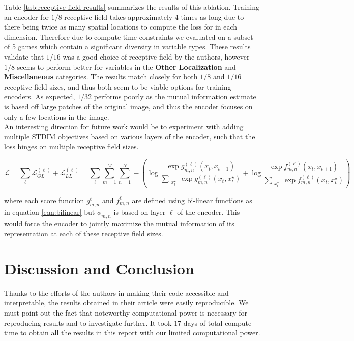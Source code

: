 Table \ref{tab:receptive-field-results} summarizes the results of this ablation. Training an encoder for $1/8$ receptive field takes approximately 4 times as long due to there being twice as many spatial locations to compute the loss for in each dimension. Therefore due to compute time constraints we evaluated on a subset of 5 games which contain a significant diversity in variable types. These results validate that $1/16$ was a good choice of receptive field by the authors, however $1/8$ seems to perform better for variables in the \textbf{Other Localization} and \textbf{Miscellaneous} categories. The results match closely for both $1/8$ and $1/16$ receptive field sizes, and thus both seem to be viable options for training encoders. As expected, $1/ 32$ performs poorly as the mutual information estimate is based off large patches of the original image, and thus the encoder focuses on only a few locations in the image. \\

An interesting direction for future work would be to experiment with adding multiple STDIM objectives based on various layers of the encoder, such that the loss hinges on multiple receptive field sizes.

\begin{equation}
\mathcal{L}=\sum_{\ell}\mathcal{L}^{(\ell)}_{GL}+\mathcal{L}^{(\ell)}_{LL}=\sum_{\ell}\sum_{m=1}^M\sum_{n=1}^N-\left(\log{\frac{\exp{g^{(\ell)}_{m,n}(x_t,x_{t+1})}}{\sum\limits_{\substack{x_t^\star}} \exp{g^{(\ell)}_{m,n}(x_t,x_t^\star)}}}+\log{\frac{\exp{f^{(\ell)}_{m,n}(x_t,x_{t+1})}}{\sum\limits_{\substack{x_t^\star}} \exp{f^{(\ell)}_{m,n}(x_t,x_t^\star)}}}\right)
\label{eqn:loss-functions-over-layers}
\end{equation}

where each score function $g^{\ell}_{m,n}$ and $f^{\ell}_{m,n}$ are defined using bi-linear functions as in equation \ref{eqn:bilinear} but $\phi_{m,n}$ is based on layer $\ell$ of the encoder. This would force the encoder to jointly maximize the mutual information of its representation at each of these receptive field sizes.

\section{Discussion and Conclusion}
Thanks to the efforts of the authors in making their code accessible and interpretable, the results obtained in their article were easily reproducible. We must point out the fact that noteworthy computational power is necessary for reproducing results and to investigate further. It took $17$ days of total compute time to obtain all the results in this report with our limited computational power.\\


